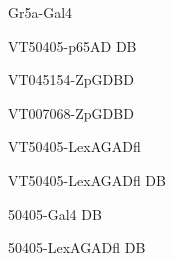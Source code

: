 \documentclass[17pt]{extarticle}
\begin{document}
\footnotesize
\vspace*{\fill}
\newpage{}
\vspace*{\fill}\begin{large}
Gr5a-Gal4 \\[0.5em]
\end{large}
\footnotesize
\vspace*{\fill}
\newpage{}
\vspace*{\fill}\begin{small}
VT50405-p65AD DB \\[0.5em]
\end{small}
\footnotesize
\vspace*{\fill}
\newpage{}
\vspace*{\fill}\begin{normalsize}
VT045154-ZpGDBD \\[0.5em]
\end{normalsize}
\footnotesize
\vspace*{\fill}
\newpage{}
\vspace*{\fill}\begin{normalsize}
VT007068-ZpGDBD \\[0.5em]
\end{normalsize}
\footnotesize
\vspace*{\fill}
\newpage{}
\vspace*{\fill}\begin{small}
VT50405-LexAGADfl \\[0.5em]
\end{small}
\footnotesize
\vspace*{\fill}
\newpage{}
\vspace*{\fill}\begin{small}
VT50405-LexAGADfl DB \\[0.5em]
\end{small}
\footnotesize
\vspace*{\fill}
\newpage{}
\vspace*{\fill}\begin{normalsize}
50405-Gal4 DB \\[0.5em]
\end{normalsize}
\footnotesize
\vspace*{\fill}
\newpage{}
\vspace*{\fill}\begin{small}
50405-LexAGADfl DB \\[0.5em]
\end{small}
\footnotesize
\vspace*{\fill}
\end{document}

